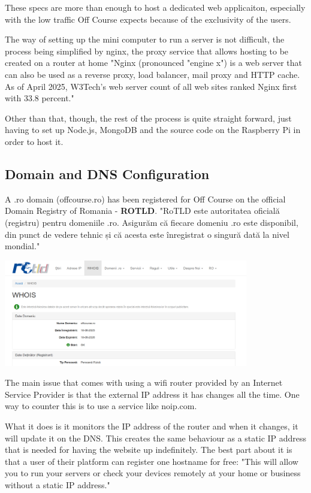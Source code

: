 \documentclass[12pt,a4paper]{report}
\begin{document}
These specs are more than enough to host a dedicated web applicaiton, especially with the low traffic Off Course expects because of the exclusivity of the users.

The way of setting up the mini computer to run a server is not difficult, the process being simplified by nginx, the proxy service that allows hosting to be created on a router at home "Nginx (pronounced "engine x") is a web server that can also be used as a reverse proxy, load balancer, mail proxy and HTTP cache. As of April 2025, W3Tech's web server count of all web sites ranked Nginx first with 33.8 percent."~\cite{nginX}

Other than that, though, the rest of the process is quite straight forward, just having to set up Node.js, MongoDB and the source code on the Raspberry Pi in order to host it.

\subsection{Domain and DNS Configuration}

A .ro domain (offcourse.ro) has been registered for Off Course on the official Domain Registry of Romania - \textbf{ROTLD}. "RoTLD este autoritatea oficială (registru) pentru domeniile .ro. Asigurăm că fiecare domeniu .ro este disponibil, din punct de vedere tehnic și că acesta este înregistrat o singură dată la nivel mondial."~\cite{roTLD}

\begin{center}
\includegraphics[width=0.8\textwidth]{images/dns.png}
\end{center}

The main issue that comes with using a wifi router provided by an Internet Service Provider is that the external IP address it has changes all the time. One way to counter this is to use a service like noip.com. 

What it does is it monitors the IP address of the router and when it changes, it will update it on the DNS. This creates the same behaviour as a static IP address that is needed for having the website up indefinitely. The best part about it is that a user of their platform can register one hostname for free: "This will allow you to run your servers or check your devices remotely at your home or business without a static IP address."~\cite{noipDNS}
\end{document}

